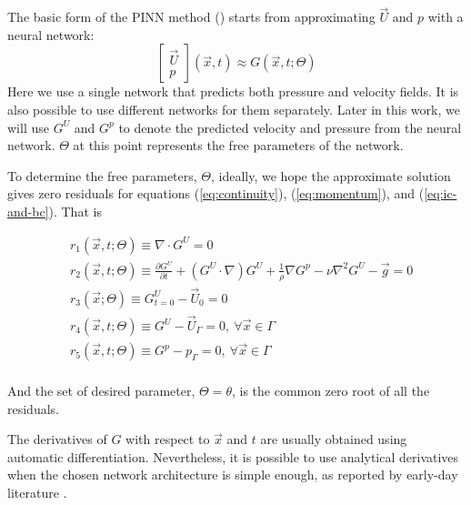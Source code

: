 
The basic form of the PINN method (\cite{raissi_physics-informed_2019,cai_physics-informed_2021}) starts from approximating $\vec{U}$ and $p$ with a neural network:
\begin{equation}\label{eq:neural-network}
    \begin{bmatrix}
        \vec{U} \\ p
    \end{bmatrix}(\vec{x}, t)
    \approx
    G(\vec{x}, t; \Theta)
\end{equation}
Here we use a single network that predicts both pressure and velocity fields.
It is also possible to use different networks for them separately.
Later in this work, we will use $G^U$ and $G^p$ to denote the predicted velocity and pressure from the neural network.
$\Theta$ at this point represents the free parameters of the network.

To determine the free parameters, $\Theta$, ideally, we hope the approximate solution gives zero residuals for equations (\ref{eq:continuity}), (\ref{eq:momentum}), and (\ref{eq:ic-and-bc}).
That is

\begin{equation}\label{eq:residuals}
    \begin{aligned}
        & r_{1}(\vec{x}, t; \Theta) \equiv \nabla \cdot G^{U} = 0 \\
        & r_{2}(\vec{x}, t; \Theta) \equiv \frac{\partial G^{U}}{\partial t}+(G^{U} \cdot \nabla) G^{U}+\frac{1}{\rho} \nabla G^p -\nu \nabla^{2} G^{U} - \vec{g} =0 \\
        & r_{3}(\vec{x}; \Theta) \equiv G^{U}_{t=0}-\vec{U}_0 = 0 \\
        & r_{4}(\vec{x}, t; \Theta) \equiv G^{U}-\vec{U}_\Gamma = 0,\ \forall \vec{x} \in \Gamma \\
        & r_{5}(\vec{x}, t; \Theta) \equiv G^{p}-p_\Gamma = 0,\ \forall \vec{x} \in \Gamma \\
   \end{aligned}
\end{equation}

And the set of desired parameter, $\Theta=\theta$, is the common zero root of all the residuals.

The derivatives of $G$ with respect to $\vec{x}$ and $t$ are usually obtained using automatic differentiation. 
Nevertheless, it is possible to use analytical derivatives when the chosen network architecture is simple enough, as reported by early-day literature \cite{lagaris_artificial_1998,Li2003}.

